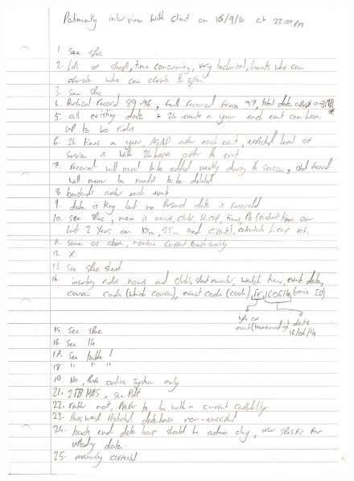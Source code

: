 \begin{figure}[H]
    \includegraphics[width=\textwidth]{./interview/InterviewNotesPage1.pdf}
\end{figure}

